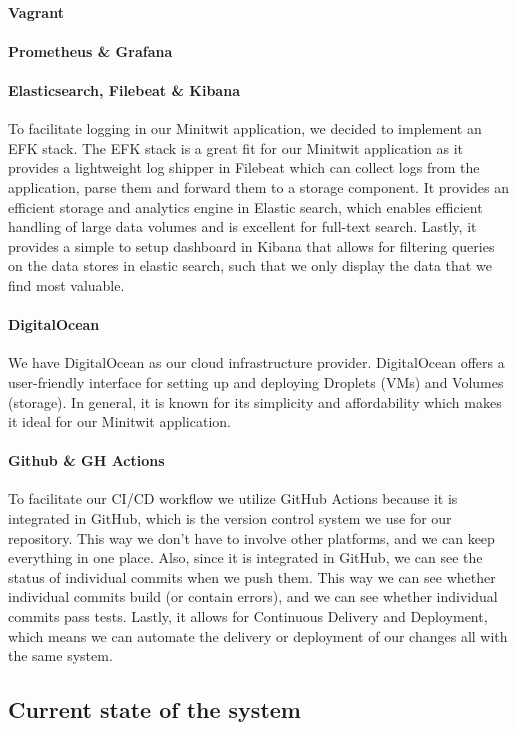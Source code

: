 \paragraph*{Vagrant}
\paragraph*{Prometheus \& Grafana}
\paragraph*{Elasticsearch, Filebeat \& Kibana}
To facilitate logging in our Minitwit application, we decided to implement an EFK stack. The EFK stack is a great fit for our Minitwit application as it provides a lightweight log shipper in Filebeat which can collect logs from the application, parse them and forward them to a storage component. It provides an efficient storage and analytics engine in Elastic search, which enables efficient handling of large data volumes and is excellent for full-text search. Lastly, it provides a simple to setup dashboard in Kibana that allows for filtering queries on the data stores in elastic search, such that we only display the data that we find most valuable. 

\paragraph*{DigitalOcean}
We have DigitalOcean as our cloud infrastructure provider. DigitalOcean offers a user-friendly interface for setting up and deploying Droplets (VMs) and Volumes (storage). In general, it is known for its simplicity and affordability which makes it ideal for our Minitwit application.

\paragraph*{Github \& GH Actions}
To facilitate our CI/CD workflow we utilize GitHub Actions because it is integrated in GitHub, which is the version control system we use for our repository. This way we don't have to involve other platforms, and we can keep everything in one place. Also, since it is integrated in GitHub, we can see the status of individual commits when we push them. This way we can see whether individual commits build (or contain errors), and we can see whether individual commits pass tests. Lastly, it allows for Continuous Delivery and Deployment, which means we can automate the delivery or deployment of our changes all with the same system.



\subsection{Current state of the system}

